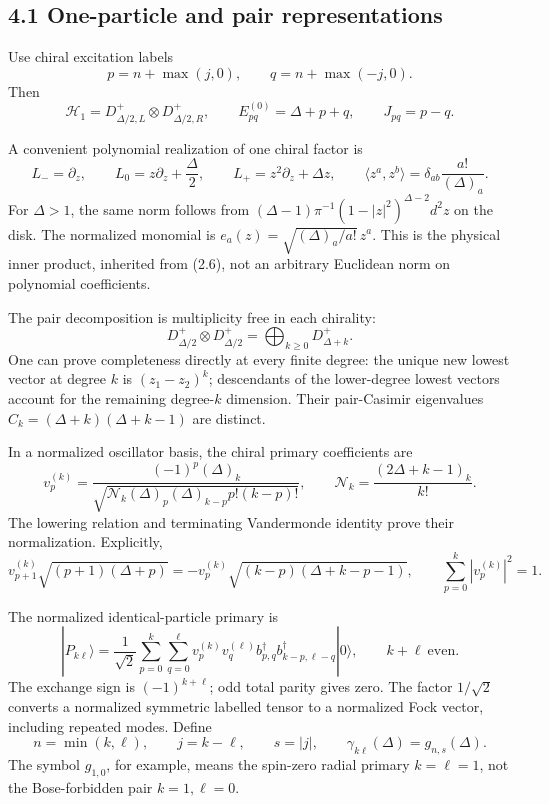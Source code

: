 \hypertarget{one-particle-and-pair-representations}{%
\subsection{4.1 One-particle and pair representations}\label{one-particle-and-pair-representations}}

Use chiral excitation labels \[
p=n+\max(j,0),\qquad q=n+\max(-j,0).
\] Then \[
\mathcal H_1=D^+_{\Delta/2,L}\otimes D^+_{\Delta/2,R},
\qquad E^{(0)}_{pq}=\Delta+p+q,\qquad J_{pq}=p-q.
\tag{4.1}
\]

A convenient polynomial realization of one chiral factor is \[
L_-=\partial_z,\qquad
L_0=z\partial_z+\frac{\Delta}{2},\qquad
L_+=z^2\partial_z+\Delta z,
\qquad
\langle z^a,z^b\rangle=\delta_{ab}\frac{a!}{(\Delta)_a}.
\tag{4.2}
\] For \(\Delta>1\), the same norm follows from \((\Delta-1)\pi^{-1}(1-|z|^2)^{\Delta-2}d^2z\) on the disk. The normalized monomial is \(e_a(z)=\sqrt{(\Delta)_a/a!}\,z^a\). This is the physical inner product, inherited from (2.6), not an arbitrary Euclidean norm on polynomial coefficients.

The pair decomposition is multiplicity free in each chirality: \[
D^+_{\Delta/2}\otimes D^+_{\Delta/2}
=\bigoplus_{k\ge0}D^+_{\Delta+k}.
\tag{4.3}
\] One can prove completeness directly at every finite degree: the unique new lowest vector at degree \(k\) is \((z_1-z_2)^k\); descendants of the lower-degree lowest vectors account for the remaining degree-\(k\) dimension. Their pair-Casimir eigenvalues \(C_k=(\Delta+k)(\Delta+k-1)\) are distinct.

In a normalized oscillator basis, the chiral primary coefficients are \[
v_p^{(k)}
=\frac{(-1)^p(\Delta)_k}
{\sqrt{\mathcal N_k(\Delta)_p(\Delta)_{k-p}p!(k-p)!}},
\qquad
\mathcal N_k=\frac{(2\Delta+k-1)_k}{k!}.
\tag{4.4}
\] The lowering relation and terminating Vandermonde identity prove their normalization. Explicitly, \[
v_{p+1}^{(k)}\sqrt{(p+1)(\Delta+p)}
=-v_p^{(k)}\sqrt{(k-p)(\Delta+k-p-1)},
\qquad
\sum_{p=0}^k|v_p^{(k)}|^2=1 .
\]

The normalized identical-particle primary is \[
|P_{k\ell}\rangle
=\frac1{\sqrt2}
\sum_{p=0}^k\sum_{q=0}^{\ell}
v_p^{(k)}v_q^{(\ell)}
b^\dagger_{p,q}b^\dagger_{k-p,\ell-q}|0\rangle,
\qquad k+\ell\ \text{even}.
\tag{4.5}
\] The exchange sign is \((-1)^{k+\ell}\); odd total parity gives zero. The factor \(1/\sqrt2\) converts a normalized symmetric labelled tensor to a normalized Fock vector, including repeated modes. Define \[
n=\min(k,\ell),\qquad j=k-\ell,\qquad s=|j|,\qquad
\gamma_{k\ell}(\Delta)=g_{n,s}(\Delta).
\tag{4.6}
\] The symbol \(g_{1,0}\), for example, means the spin-zero radial primary \(k=\ell=1\), not the Bose-forbidden pair \(k=1,\ell=0\).

